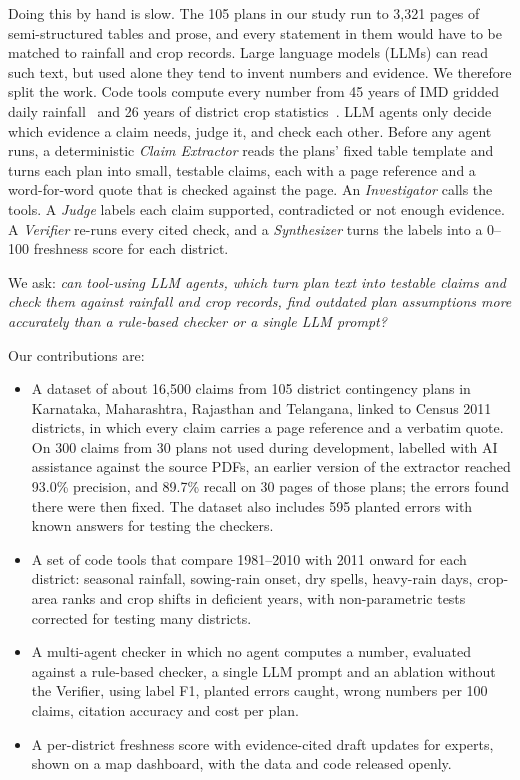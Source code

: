 Doing this by hand is slow. The 105 plans in our study run to 3,321 pages of
semi-structured tables and prose, and every statement in them would have to be
matched to rainfall and crop records. Large language models (LLMs) can read such text,
but used alone they tend to invent numbers and evidence. We therefore split the work.
Code tools compute every number from 45 years of IMD gridded daily
rainfall~\cite{pai2014gridded,imd_gridded} and 26 years of district crop
statistics~\cite{moa_crops}. LLM agents only decide which evidence a claim needs,
judge it, and check each other. Before any agent runs, a deterministic \emph{Claim
Extractor} reads the plans' fixed table template and turns each plan into small, testable
claims, each with a page reference and a word-for-word quote that is checked against the
page. An \emph{Investigator} calls the tools. A \emph{Judge} labels each claim supported,
contradicted or not enough evidence. A \emph{Verifier} re-runs every cited check, and
a \emph{Synthesizer} turns the labels into a 0--100 freshness score for each district.

We ask: \emph{can tool-using LLM agents, which turn plan text into testable claims and
check them against rainfall and crop records, find outdated plan assumptions more
accurately than a rule-based checker or a single LLM prompt?}

Our contributions are:
\begin{itemize}
  \item A dataset of about 16,500 claims from 105 district contingency plans in
        Karnataka, Maharashtra, Rajasthan and Telangana, linked to Census 2011 districts,
        in which every claim carries a page reference and a verbatim quote. On 300
        claims from 30 plans not used during development, labelled with AI assistance
        against the source PDFs, an earlier version of the extractor reached 93.0\%
        precision, and 89.7\% recall on 30 pages of those plans; the errors found there
        were then fixed. The dataset also includes 595 planted errors with known answers
        for testing the checkers.
  \item A set of code tools that compare 1981--2010 with 2011 onward for each
        district: seasonal rainfall, sowing-rain onset, dry spells, heavy-rain days,
        crop-area ranks and crop shifts in deficient years, with non-parametric tests
        corrected for testing many districts.
  \item A multi-agent checker in which no agent computes a number, evaluated
        against a rule-based checker, a single LLM prompt and an ablation without the
        Verifier, using label F1, planted errors caught, wrong numbers per 100 claims,
        citation accuracy and cost per plan.
  \item A per-district freshness score with evidence-cited draft updates for
        experts, shown on a map dashboard, with the data and code released openly.
\end{itemize}

